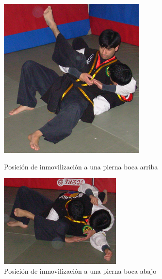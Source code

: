 \begin{enumerate}
	\begin{figure}[h]
		\centering
		\begin{minipage}{0.45\textwidth}
			\includegraphics[width=\linewidth]{images/Lucha_de_Piso/07_inmovilizacion_a_una_pierna_frontal.png}
			\caption{Posición de inmovilización a una pierna boca arriba}
			\label{fig:inmovilizacion_una_pierna_frontal_lp}
		\end{minipage}
		\hfill
		\begin{minipage}{0.45\textwidth}
			\includegraphics[width=\linewidth]{images/Lucha_de_Piso/08_inmovilizacion_a_una_pierna_lateral.png}
			\caption{Posición de inmovilización a una pierna boca abajo}
			\label{fig:inmovilizacion_una_pierna_lateral_lp}
		\end{minipage}
		\hfill
	\end{figure}


\end{enumerate}
